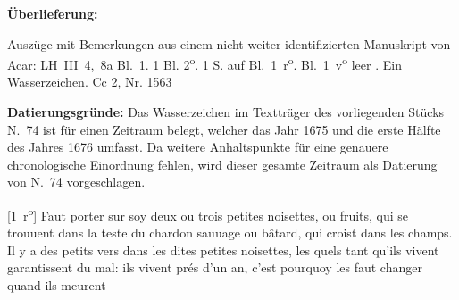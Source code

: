 \begin{ledgroupsized}[r]{120mm}%
\footnotesize%
\pstart%
\noindent\textbf{\"{U}berlieferung:}%
\pend%
\end{ledgroupsized}%
\begin{ledgroupsized}[r]{114mm}%
\footnotesize%
\pstart%
\parindent -6mm%
%
Auszüge mit Bemerkungen aus einem nicht weiter identifizierten Manuskript von Acar:
LH~III~4,~8a Bl.~1.
1 Bl. 2\textsuperscript{o}. 1 S. auf Bl.~1~r\textsuperscript{o}.
Bl.~1~v\textsuperscript{o} leer%
. Ein Wasserzeichen.%
\newline%
Cc 2, Nr. 1563%
\pend%
\end{ledgroupsized}%
%
\vspace*{5mm}%
\begin{ledgroup}%
\footnotesize%
\pstart%
\noindent%
\footnotesize{%
\textbf{Datierungsgr\"{u}nde:}
Das Wasserzeichen im Textträger des vorliegenden Stücks N.~74 %
ist für einen Zeit\-raum belegt, welcher das Jahr 1675 und die erste Hälfte des Jahres 1676 umfasst.
Da weitere Anhalts\-punk\-te für eine genauere chronologische Einordnung fehlen,
wird dieser gesamte Zeitraum als Datierung von N.~74 %
vorgeschlagen.}%
\pend%
\end{ledgroup}%
%
%
\vspace{6mm}%
\count{}
\count{}
\count{}
\pstart%
\normalsize%
\noindent%
[1~r\textsuperscript{o}] 
%
%
\pend%
\pstart%
\protect{}
Faut porter sur soy deux ou trois petites noisettes, ou fruits, qui se trouuent dans la teste du chardon\protect{} sauuage ou b\^{a}tard, qui croist dans les champs. Il y a des petits vers dans les dites petites noisettes, les quels tant qu'ils vivent garantissent du mal: ils vivent pr\'{e}s d'un an, c'est pourquoy les faut changer quand ils meurent
